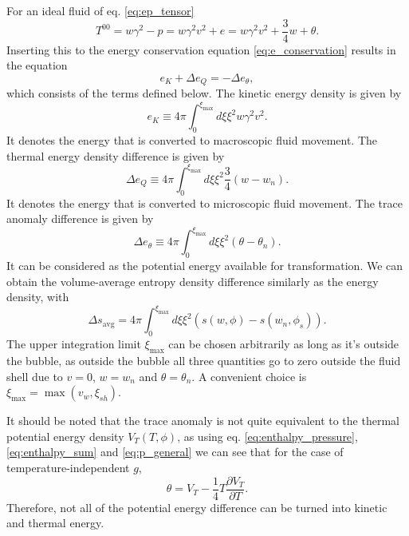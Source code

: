 For an ideal fluid of eq. \eqref{eq:ep_tensor} \cite[eq. B.23]{hindmarsh_gw_pt_2019}
\begin{equation}
T^{00} = w\gamma^2 - p = w\gamma^2 v^2 + e = w\gamma^2 v^2 + \frac{3}{4}w + \theta.
\end{equation}
Inserting this to the energy conservation equation \eqref{eq:e_conservation} results in the equation \cite[eq. B.24]{hindmarsh_gw_pt_2019}
\begin{equation}
e_K + \Delta e_Q = - \Delta e_\theta,
\label{eq:energy_components}
\end{equation}
which consists of the terms defined below.
The kinetic energy density is given by
\begin{equation}
e_K \equiv 4 \pi \int_0^{\xi_\text{max}} d\xi \xi^2 w \gamma^2 v^2.
\label{eq:kinetic_energy_density}
\end{equation}
It denotes the energy that is converted to macroscopic fluid movement.
The thermal energy density difference is given by
\begin{equation}
\Delta e_Q \equiv 4 \pi \int_0^{\xi_\text{max}} d\xi \xi^2 \frac{3}{4} (w - w_n).
\label{eq:thermal_energy_density}
\end{equation}
It denotes the energy that is converted to microscopic fluid movement.
The trace anomaly difference is given by
\begin{equation}
\Delta e_\theta \equiv 4 \pi \int_0^{\xi_\text{max}} d\xi \xi^2 (\theta - \theta_n).
\end{equation}
It can be considered as the potential energy available for transformation.
We can obtain the volume-average entropy density difference similarly as the energy density, with
\begin{equation}
\Delta s_\text{avg} = 4\pi \int_0^{\xi_\text{max}} d\xi \xi^2 \left( s(w,\phi) - s(w_n, \phi_s) \right).
\end{equation}
The upper integration limit $\xi_\text{max}$ can be chosen arbitrarily as long as it's outside the bubble, as outside the bubble all three quantities go to zero outside the fluid shell due to $v=0$, $w=w_n$ and $\theta = \theta_n$.
A convenient choice is $\xi_\text{max} = \max (v_w, \xi_{sh})$.
\cite[eq. B.25]{hindmarsh_gw_pt_2019}

It should be noted that the trace anomaly is not quite equivalent to the thermal potential energy density $V_T(T,\phi)$, as using eq. \eqref{eq:enthalpy_pressure}, \eqref{eq:enthalpy_sum} and \eqref{eq:p_general} we can see that for the case of temperature-independent $g$,
\begin{equation}
\theta = V_T - \frac{1}{4} T \frac{\partial V_T}{\partial T}.
\end{equation}
Therefore, not all of the potential energy difference can be turned into kinetic and thermal energy.
\cite[ch. B.2]{hindmarsh_gw_pt_2019}


